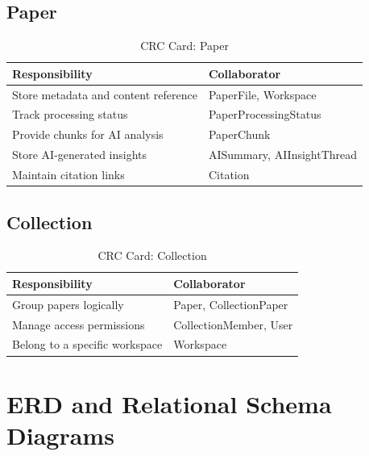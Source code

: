 \subsection{Paper}

\begin{table}[H]
    \centering
    \small
    \begin{tabularx}{\textwidth}{|l|X|}
        \hline
        \textbf{Responsibility}              & \textbf{Collaborator}      \\
        \hline
        Store metadata and content reference & PaperFile, Workspace       \\
        \hline
        Track processing status              & PaperProcessingStatus      \\
        \hline
        Provide chunks for AI analysis       & PaperChunk                 \\
        \hline
        Store AI-generated insights          & AISummary, AIInsightThread \\
        \hline
        Maintain citation links              & Citation                   \\
        \hline
    \end{tabularx}
    \caption{CRC Card: Paper}
    \label{tab:crc-paper}
\end{table}

\subsection{Collection}

\begin{table}[H]
    \centering
    \small
    \begin{tabularx}{\textwidth}{|l|X|}
        \hline
        \textbf{Responsibility}        & \textbf{Collaborator}  \\
        \hline
        Group papers logically         & Paper, CollectionPaper \\
        \hline
        Manage access permissions      & CollectionMember, User \\
        \hline
        Belong to a specific workspace & Workspace              \\
        \hline
    \end{tabularx}
    \caption{CRC Card: Collection}
    \label{tab:crc-collection}
\end{table}

\section{ERD and Relational Schema Diagrams}
\label{sec:erd-and-schema}

